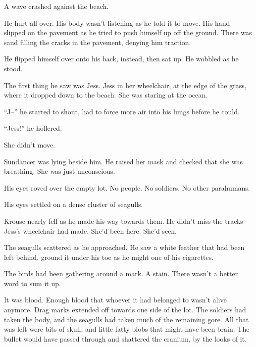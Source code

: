 A wave crashed against the beach.



He hurt all over.  His body wasn't listening as he told it to move.  His hand slipped on the pavement as he tried to push himself up off the ground.  There was sand filling the cracks in the pavement, denying him traction.



He flipped himself over onto his back, instead, then sat up.  He wobbled as he stood.



The first thing he saw was Jess.  Jess in her wheelchair, at the edge of the grass, where it dropped down to the beach.  She was staring at the ocean.



``J--'' he started to shout, had to force more air into his lungs before he could.



``Jess!'' he hollered.



She didn't move.



Sundancer was lying beside him.  He raised her mask and checked that she was breathing.  She was just unconscious.



His eyes roved over the empty lot.  No people.  No soldiers.  No other parahumans.



His eyes settled on a dense cluster of seagulls.



Krouse nearly fell as he made his way towards them.  He didn't miss the tracks Jess's wheelchair had made.  She'd been here.  She'd seen.



The seagulls scattered as he approached.  He saw a white feather that had been left behind, ground it under his toe as he might one of his cigarettes.



The birds had been gathering around a mark.  A stain.  There wasn't a better word to sum it up.



It was blood.  Enough blood that whoever it had belonged to wasn't alive anymore.  Drag marks extended off towards one side of the lot.  The soldiers had taken the body, and the seagulls had taken much of the remaining gore.  All that was left were bits of skull, and little fatty blobs that might have been brain.  The bullet would have passed through and shattered the cranium, by the looks of it.



